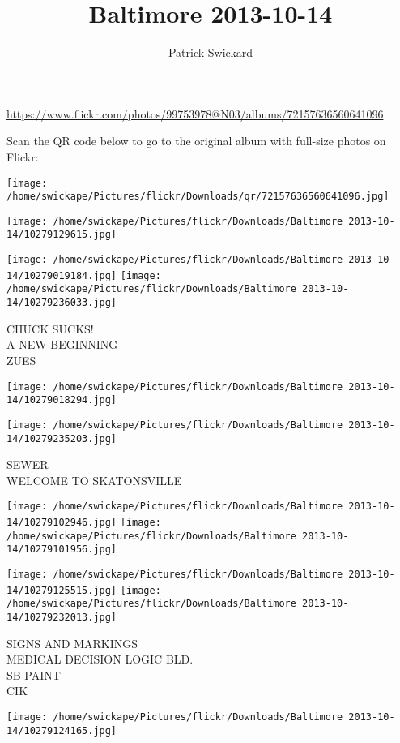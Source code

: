 \documentclass[10pt,letterpaper]{article}
\title{Baltimore 2013-10-14}
\author{Patrick Swickard}
\date{}
\begin{document}
\maketitle

\url{https://www.flickr.com/photos/99753978@N03/albums/72157636560641096}

Scan the QR code below to go to the original album with full-size photos on Flickr:

\texttt{[image: /home/swickape/Pictures/flickr/Downloads/qr/72157636560641096.jpg]}
\pagebreak

\texttt{[image: /home/swickape/Pictures/flickr/Downloads/Baltimore 2013-10-14/10279129615.jpg]}

\vspace{0.25in}
\texttt{[image: /home/swickape/Pictures/flickr/Downloads/Baltimore 2013-10-14/10279019184.jpg]}
\texttt{[image: /home/swickape/Pictures/flickr/Downloads/Baltimore 2013-10-14/10279236033.jpg]}

CHUCK SUCKS!\\
A NEW BEGINNING\\
ZUES
\pagebreak

\texttt{[image: /home/swickape/Pictures/flickr/Downloads/Baltimore 2013-10-14/10279018294.jpg]}

\vspace{0.25in}
\texttt{[image: /home/swickape/Pictures/flickr/Downloads/Baltimore 2013-10-14/10279235203.jpg]}

SEWER\\
WELCOME TO SKATONSVILLE
\pagebreak

\texttt{[image: /home/swickape/Pictures/flickr/Downloads/Baltimore 2013-10-14/10279102946.jpg]}
\texttt{[image: /home/swickape/Pictures/flickr/Downloads/Baltimore 2013-10-14/10279101956.jpg]}

\texttt{[image: /home/swickape/Pictures/flickr/Downloads/Baltimore 2013-10-14/10279125515.jpg]}
\texttt{[image: /home/swickape/Pictures/flickr/Downloads/Baltimore 2013-10-14/10279232013.jpg]}

SIGNS AND MARKINGS\\
MEDICAL DECISION LOGIC BLD.\\
SB PAINT\\
CIK
\pagebreak

\texttt{[image: /home/swickape/Pictures/flickr/Downloads/Baltimore 2013-10-14/10279124165.jpg]}
\end{document}
